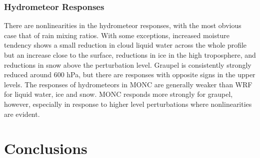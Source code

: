 \documentclass[draft]{agujournal2019}
\begin{document}
\subsubsection{Hydrometeor Responses}

There are nonlinearities in the hydrometeor responses, with the most obvious
case that of rain mixing ratios. With some exceptions, increased moisture
tendency shows a small reduction in cloud liquid water across the whole profile
but an increase close to the surface, reductions in ice in the high troposphere,
and reductions in snow above the perturbation level. Graupel is consistently
strongly reduced around 600 hPa, but there are responses with opposite signs in
the upper levels. The responses of hydrometeors in MONC are generally weaker
than WRF for liquid water, ice and snow. MONC responds more strongly for
graupel, however, especially in response to higher level perturbations where
nonlinearities are evident.

\section{Conclusions}
\label{sec:conclusions}
\end{document}
